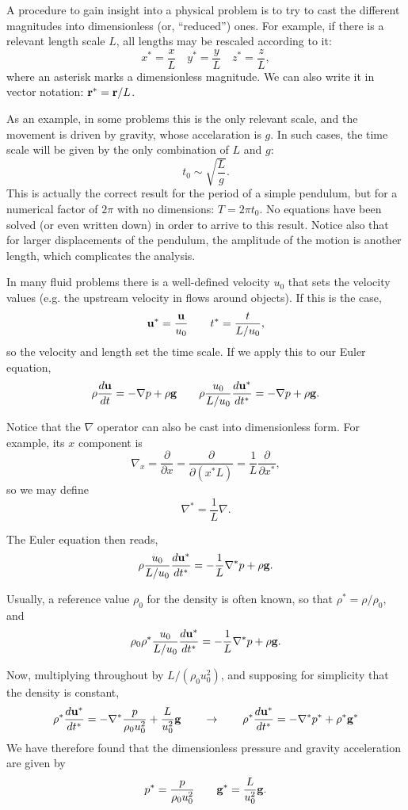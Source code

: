 A procedure to gain insight into a physical problem is to try to cast
the different magnitudes into dimensionless (or, ``reduced'')
ones. For example, if there is a relevant length scale $L$, all
lengths may be rescaled according to it:
\[
x^*=\frac{x}{L} \quad
y^*=\frac{y}{L} \quad
z^*=\frac{z}{L} ,
\]
where an asterisk marks a dimensionless magnitude. We can also write
it in vector notation: $\mathbf{r}^* = \mathbf{r} / L$.

As an example, in some problems this is the only relevant scale, and
the movement is driven by gravity, whose accelaration is $g$. In such
cases, the time scale will be given by the only combination of $L$ and
$g$:
\[
t_0 \sim \sqrt{\frac{ L }{ g }} .
\]
This is actually the correct result for the period of a simple
pendulum, but for a numerical factor of $2\pi$ with no dimensions:
$T=2\pi t_0$. No equations have been solved (or even written down) in
order to arrive to this result. Notice also that for larger
displacements of the pendulum, the amplitude of the motion is another
length, which complicates the analysis.

In many fluid problems there is a well-defined velocity $u_0$ that
sets the velocity values (e.g. the upstream velocity in flows around
objects). If this is the case,
\[
\mathbf{u}^* = \frac{\mathbf{u}}{u_0} \qquad
t^*=\frac{t}{L/u_0} ,
\]
so the velocity and length set the time scale. If we apply this to
our Euler equation,
\[
\rho \frac{d\mathbf{u} }{dt} =
- \nabla p 
+ \rho \mathbf{g}  \qquad
\rho \frac{u_0}{L/u_0} \frac{d\mathbf{u}^* }{dt^* } =
- \nabla p 
+ \rho \mathbf{g} .
\]

Notice that the $\nabla$ operator can also be cast into dimensionless
form. For example, its $x$ component is
\[
\nabla_x = \frac{\partial}{\partial x} = \frac{\partial}{\partial (x^* L) } =
\frac{ 1 }{ L } \frac{\partial}{\partial x^* },
\]
so we may define
\[
\nabla^* = \frac{ 1 }{ L } \nabla.
\]

The Euler equation then reads,
\[
\rho \frac{u_0}{L/u_0} \frac{d\mathbf{u}^* }{dt^* } =
- \frac{ 1 }{ L } \nabla^* p 
+ \rho \mathbf{g} .
\]

Usually, a reference value $\rho_0$ for the density is often known, so
that $\rho^* = \rho / \rho_0$, and
\[
\rho_0 \rho^* \frac{u_0}{L/u_0} \frac{d\mathbf{u}^* }{dt^* } =
- \frac{ 1 }{ L } \nabla^* p 
+ \rho \mathbf{g} .
\]


Now, multiplying throughout by $L/(\rho_0 u_0^2)$, and supposing for simplicity
that the density is constant,
\begin{equation}
  \label{eq:Euler_just_before_adim}
\rho^*
\frac{d\mathbf{u}^* }{dt^* } =
-  \nabla^* \frac{ p }{ \rho_0 u_0^2 } 
+  \frac{ L }{ u_0^2 } \mathbf{g} \qquad \to \qquad
\rho^* \frac{d\mathbf{u}^* }{dt^* } =
-  \nabla^* p^*
+  \rho^* \mathbf{g}^* 
\end{equation}
We have therefore found that the dimensionless pressure and gravity
acceleration are given by
\[
p^*= \frac{ p }{ \rho_0 u_0^2 } \qquad
\mathbf{g}^* = \frac{ L }{ u_0^2 } \mathbf{g} .
\]

